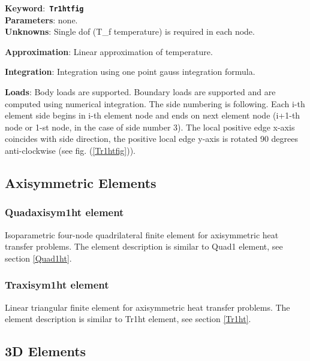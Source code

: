 \documentclass[a4paper]{article}
\newcommand{\descitem}[1]{{\noindent \bf #1}:}
\newcommand{\elemkeyword}[1]{\descitem{Keyword}~{\bf \texttt{#1}}}
\begin{document}
\elemkeyword{Tr1htfig}\\
\descitem{Parameters} none.\\
\descitem{Unknowns}
Single dof (T\_f temperature) is  required in each node.

\descitem{Approximation} Linear approximation of temperature.

\descitem{Integration}
Integration using one point gauss integration formula.

\descitem{Loads} Body loads are supported. Boundary loads are
supported and are computed  using numerical integration. The side numbering is
following. Each i-th element side begins in i-th element node and
ends on next element node (i+1-th node or 1-st node, in the case of 
side number 3). The local positive edge x-axis coincides with side
direction, the positive local edge y-axis is rotated 90 degrees
anti-clockwise (see fig. (\ref{Tr1htfig})).



\subsection{Axisymmetric Elements}
\subsubsection{Quadaxisym1ht element}
Isoparametric four-node quadrilateral finite element for
axisymmetric heat transfer problems. The element description is
similar to Quad1 element, see section \ref{Quad1ht}.


\subsubsection{Traxisym1ht element}
Linear triangular finite element for axisymmetric heat transfer
problems. The element description is
similar to Tr1ht element, see section \ref{Tr1ht}.

\subsection{3D Elements}
\end{document}
